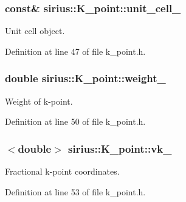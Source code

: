 \subsubsection[{unit\+\_\+cell\+\_\+}]{ const\& sirius\+::\+K\+\_\+point\+::unit\+\_\+cell\+\_\+\hspace{0.3cm}{\ttfamily [private]}}\label{classsirius_1_1_k__point_aa67d12ebc672e0b301abe37761beb732}


Unit cell object. 



Definition at line 47 of file k\+\_\+point.\+h.

\hypertarget{classsirius_1_1_k__point_ab3965c7b91f584168bf92d4d59dd0fc4}{}
\subsubsection[{weight\+\_\+}]{\setlength{\rightskip}{0pt plus 5cm}double sirius\+::\+K\+\_\+point\+::weight\+\_\+\hspace{0.3cm}{\ttfamily [private]}}\label{classsirius_1_1_k__point_ab3965c7b91f584168bf92d4d59dd0fc4}


Weight of k-\/point. 



Definition at line 50 of file k\+\_\+point.\+h.

\hypertarget{classsirius_1_1_k__point_a7d2852ebbede1528de4b8464f9ab1a7a}{}
\subsubsection[{vk\+\_\+}]{$<$double$>$ sirius\+::\+K\+\_\+point\+::vk\+\_\+\hspace{0.3cm}{\ttfamily [private]}}\label{classsirius_1_1_k__point_a7d2852ebbede1528de4b8464f9ab1a7a}


Fractional k-\/point coordinates. 



Definition at line 53 of file k\+\_\+point.\+h.

\hypertarget{classsirius_1_1_k__point_aa35c8c7b4c50603dcdd68267a0f5214f}{}
